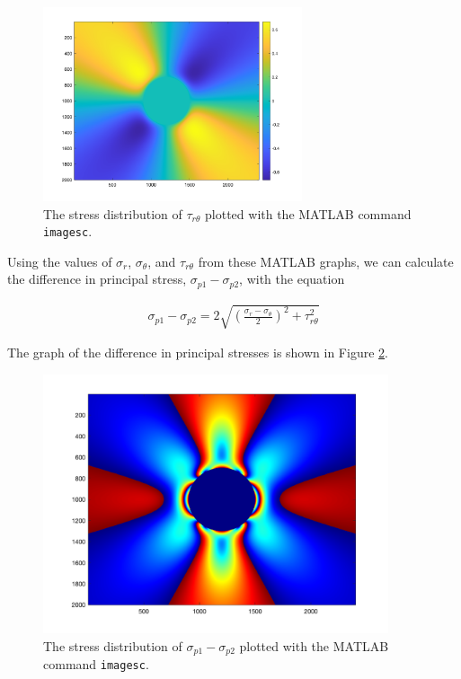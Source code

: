\documentclass[12 pt]{article}
\begin{document}
\begin{figure}[htbp]
\centering
\includegraphics[width=3in]{images/Graphs/tau_rtheta}
\caption{The stress distribution of $\tau_{r\theta}$ plotted with the MATLAB command \texttt{imagesc}.}
\label{fig:tau_rtheta}
\end{figure}

Using the values of $\sigma_r$, $\sigma_\theta$, and $\tau_{r\theta}$ from these MATLAB graphs, we can calculate the difference in principal stress, $\sigma_{p1}-\sigma_{p2}$, with the equation

\begin{align}
\sigma_{p1}-\sigma_{p2}=2\sqrt{\left(\frac{\sigma_r-\sigma_\theta}{2}\right)^2+\tau_{r\theta}^2}
\end{align}

The graph of the difference in principal stresses is shown in Figure \ref{fig:principal_stress_diff}.

\begin{figure}[htbp]
\centering
\includegraphics[width=4in]{images/Graphs/principal_stress_diff}
\caption{The stress distribution of $\sigma_{p1}-\sigma_{p2}$ plotted with the MATLAB command \texttt{imagesc}.}
\label{fig:principal_stress_diff}
\end{figure}
\end{document}
